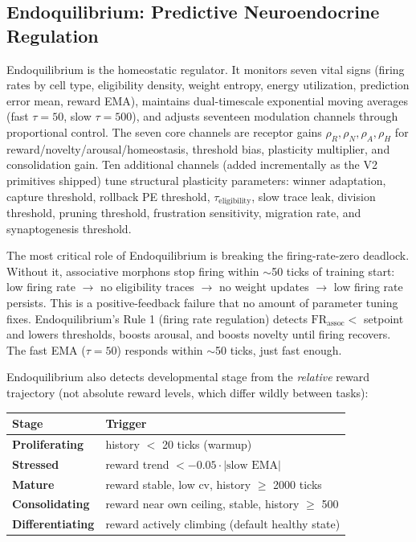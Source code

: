 \subsection{Endoquilibrium: Predictive Neuroendocrine Regulation}
\label{sec:endo}

Endoquilibrium is the homeostatic regulator. It monitors seven vital signs (firing rates by cell type, eligibility density, weight entropy, energy utilization, prediction error mean, reward EMA), maintains dual-timescale exponential moving averages (fast $\tau=50$, slow $\tau=500$), and adjusts seventeen modulation channels through proportional control. The seven core channels are receptor gains $\rho_R, \rho_N, \rho_A, \rho_H$ for reward/novelty/arousal/homeostasis, threshold bias, plasticity multiplier, and consolidation gain. Ten additional channels (added incrementally as the V2 primitives shipped) tune structural plasticity parameters: winner adaptation, capture threshold, rollback PE threshold, $\tau_{\text{eligibility}}$, slow trace leak, division threshold, pruning threshold, frustration sensitivity, migration rate, and synaptogenesis threshold.

The most critical role of Endoquilibrium is breaking the firing-rate-zero deadlock. Without it, associative morphons stop firing within $\sim$50 ticks of training start: low firing rate $\to$ no eligibility traces $\to$ no weight updates $\to$ low firing rate persists. This is a positive-feedback failure that no amount of parameter tuning fixes. Endoquilibrium's Rule 1 (firing rate regulation) detects $\text{FR}_{\text{assoc}} < $ setpoint and lowers thresholds, boosts arousal, and boosts novelty until firing recovers. The fast EMA ($\tau = 50$) responds within $\sim$50 ticks, just fast enough.

Endoquilibrium also detects developmental stage from the \emph{relative} reward trajectory (not absolute reward levels, which differ wildly between tasks):

\begin{center}
\small
\begin{tabular}{ll}
\toprule
Stage & Trigger \\
\midrule
\textbf{Proliferating}    & history $<$ 20 ticks (warmup) \\
\textbf{Stressed}         & reward trend $< -0.05 \cdot |\text{slow EMA}|$ \\
\textbf{Mature}           & reward stable, low cv, history $\geq$ 2000 ticks \\
\textbf{Consolidating}    & reward near own ceiling, stable, history $\geq$ 500 \\
\textbf{Differentiating}  & reward actively climbing (default healthy state) \\
\bottomrule
\end{tabular}
\end{center}

